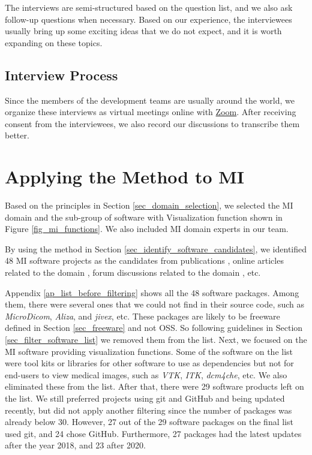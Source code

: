 The interviews are semi-structured based on the question list, and we also ask follow-up questions when necessary. Based on our experience, the interviewees usually bring up some exciting ideas that we do not expect, and it is worth expanding on these topics.

\subsection{Interview Process}
Since the members of the development teams are usually around the world, we organize these interviews as virtual meetings online with \hyperlink{https://zoom.us/}{Zoom}. After receiving consent from the interviewees, we also record our discussions to transcribe them better.

\section{Applying the Method to MI}
\label{sec_applying_method}

Based on the principles in Section \ref{sec_domain_selection}, we selected the MI domain and the sub-group of software with Visualization function shown in Figure \ref{fig_mi_functions}. We also included MI domain experts in our team.

By using the method in Section \ref{sec_identify_software_candidates}, we identified 48 MI software projects as the candidates from publications \cite{Bjorn2017} \cite{Bruhschwein2019} \cite{Haak2015}, online articles related to the domain \cite{Emms2019} \cite{Hasan2020} \cite{Mu2019}, forum discussions related to the domain \cite{Samala2014}, etc.

Appendix \ref{ap_list_before_filtering} shows all the 48 software packages. Among them, there were several ones that we could not find in their source code, such as \textit{MicroDicom}, \textit{Aliza}, and \textit{jivex}, etc. These packages are likely to be freeware defined in Section \ref{sec_freeware} and not OSS. So following guidelines in Section \ref{sec_filter_software_list} we removed them from the list. Next, we focused on the MI software providing visualization functions. Some of the software on the list were tool kits or libraries for other software to use as dependencies but not for end-users to view medical images, such as \textit{VTK}, \textit{ITK}, \textit{dcm4che}, etc. We also eliminated these from the list. After that, there were 29 software products left on the list. We still preferred projects using git and GitHub and being updated recently, but did not apply another filtering since the number of packages was already below 30. However, 27 out of the 29 software packages on the final list used git, and 24 chose GitHub. Furthermore, 27 packages had the latest updates after the year 2018, and 23 after 2020.

